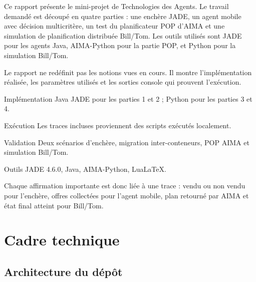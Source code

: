 \documentclass[11pt,a4paper]{report}
\begin{document}
Ce rapport présente le mini-projet de Technologies des Agents. Le travail demandé est découpé en quatre parties : une enchère JADE, un agent mobile avec décision multicritère, un test du planificateur POP d'AIMA et une simulation de planification distribuée Bill/Tom.
Les outils utilisés sont JADE pour les agents Java, AIMA-Python pour la partie POP, et Python pour la simulation Bill/Tom.

\begin{infobox}
Le rapport ne redéfinit pas les notions vues en cours. Il montre l'implémentation réalisée, les paramètres utilisés et les sorties console qui prouvent l'exécution.
\end{infobox}

\begin{tcbraster}[raster columns=2, raster equal height, raster column skip=8pt, raster row skip=8pt]
    \begin{metricbox}{\quad Implémentation}
    Java JADE pour les parties 1 et 2 ; Python pour les parties 3 et 4.
    \end{metricbox}
    \begin{metricbox}{\quad Exécution}
    Les traces incluses proviennent des scripts exécutés localement.
    \end{metricbox}
    \begin{metricbox}{\quad Validation}
    Deux scénarios d'enchère, migration inter-conteneurs, POP AIMA et simulation Bill/Tom.
    \end{metricbox}
    \begin{metricbox}{\quad Outils}
    JADE 4.6.0, Java, AIMA-Python, LuaLaTeX.
    \end{metricbox}
\end{tcbraster}

Chaque affirmation importante est donc liée à une trace : vendu ou non vendu pour l'enchère, offres collectées pour l'agent mobile, plan retourné par AIMA et état final atteint pour Bill/Tom.

\chapter{Cadre technique}

\section{Architecture du dépôt}
\end{document}
